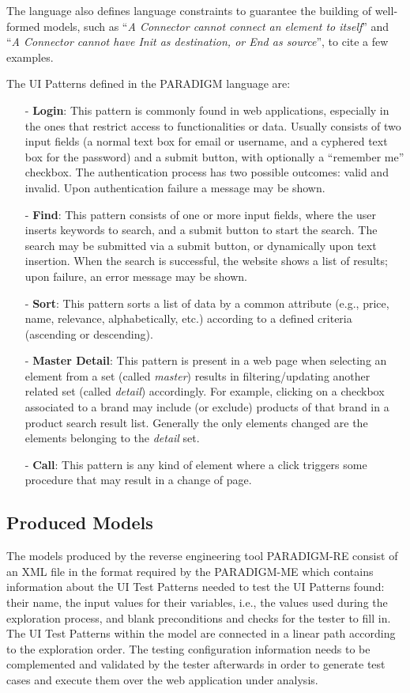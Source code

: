 \documentclass[10pt, conference, compsocconf]{IEEEtran}
\begin{document}
The language also defines language constraints to guarantee the building of well-formed models, such as ``\textit{A Connector cannot connect an element to itself}'' and ``\textit{A Connector cannot have Init as destination, or End as source}'', to cite a few examples.

The UI Patterns defined in the PARADIGM language are:
\begin{itemize}
\item[-] \textbf{Login}: This pattern is commonly found in web applications, especially in the ones that restrict access to functionalities or data. Usually consists of two input fields (a normal text box for email or username, and a cyphered text box for the password) and a submit button, with optionally a ``remember me'' checkbox. The authentication process has two possible outcomes: valid and invalid. Upon authentication failure a message may be shown. 
\item[-] \textbf{Find}: This pattern consists of one or more input fields, where the user inserts keywords to search, and a submit button to start the search. The search may be submitted via a submit button, or dynamically upon text insertion. When the search is successful, the website shows a list of results; upon failure, an error message may be shown.
\item[-] \textbf{Sort}: This pattern sorts a list of data by a common attribute (e.g., price, name, relevance, alphabetically, etc.) according to a defined criteria (ascending or descending).
\item[-] \textbf{Master Detail}: This pattern is present in a web page when selecting an element from a set (called \textit{master}) results in filtering/updating another related set (called \textit{detail}) accordingly. For example, clicking on a checkbox associated to a brand may include (or exclude) products of that brand in a product search result list. Generally the only elements changed are the elements belonging to the \textit{detail} set.
\item[-] \textbf{Call}: This pattern is any kind of element where a click triggers some procedure that may result in a change of page.
\end{itemize}

\subsection{Produced Models}

The models produced by the reverse engineering tool PARADIGM-RE consist of an XML file in the format required by the PARADIGM-ME which contains information about the UI Test Patterns needed to test the UI Patterns found: their name, the input values for their variables, i.e., the values used during the exploration process, and blank preconditions and checks for the tester to fill in. The UI Test Patterns within the model are connected in a linear path according to the exploration order. The testing configuration information needs to be complemented and validated by the tester afterwards in order to generate test cases and execute them over the web application under analysis.
\end{document}
